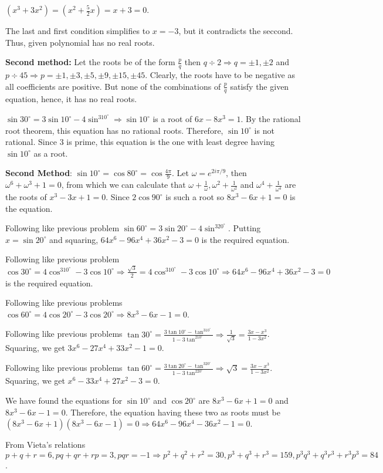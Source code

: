   $(x^3 + 3x^2) = \left(x^2 + \frac{5}{2}x\right) = x + 3 = 0$.

  The last and first condition simplifies to $x = -3$, but it contradicts the seccond. Thus, given
  polynomial has no real roots.

  {\bf Second method:} Let the roots be of the form $\frac{p}{q}$ then $q\div 2 \Rightarrow q = \pm 1, \pm
  2$ and $p\div 45 \Rightarrow p = \pm1, \pm3, \pm5, \pm9, \pm15, \pm45$. Clearly, the roots have to be
  negative as all coefficients are positive. But none of the combinations of $\frac{p}{q}$ satisfy the given
  equation, hence, it has no real roots.
\item $\sin30^\circ = 3\sin10^\circ - 4\sin^310^\circ \Rightarrow \sin10^\circ$ is a root of $6x - 8x^3 =
  1$. By the rational root theorem, this equation has no rational roots. Therefore, $\sin10^\circ$ is not
  rational. Since $3$ is prime, this equation is the one with least degree having $\sin10^\circ$ as a root.

  {\bf Second Method}: $\sin10^\circ = \cos80^\circ = \cos\frac{4\pi}{9}$. Let $\omega = e^{2i\pi/9}$, then
  $\omega^6 + \omega^3 + 1 = 0$, from which we can calculate that $\omega + \frac{1}{\omega}, \omega^2 +
  \frac{1}{\omega^2}$ and $\omega^4 + \frac{1}{\omega^4}$ are the roots of $x^3 - 3x + 1 = 0$. Since
  $2\cos90^\circ$ is such a root so $8x^3 - 6x + 1 = 0$ is the equation.
\item Following like previous problem $\sin60^\circ = 3\sin20^\circ - 4\sin^320^\circ$. Putting $x =
  \sin20^\circ$ and squaring, $64x^6 - 96x^4 + 36x^2 - 3 = 0$ is the required equation.
\item Following like previous problem $\cos30^\circ = 4\cos^310^\circ - 3\cos10^\circ \Rightarrow
  \frac{\sqrt{3}}{2} = 4\cos^310^\circ - 3\cos10^\circ \Rightarrow 64x^6 - 96x^4 + 36x^2 - 3 = 0$ is the
  required equation.
\item Following like previous problems $\cos60^\circ = 4\cos20^\circ - 3\cos20^\circ \Rightarrow 8x^3 - 6x -
  1 = 0$.
\item Following like previous problems $\tan30^\circ = \frac{3\tan10^\circ - \tan^310^\circ}{1 -
  3\tan^210^\circ} \Rightarrow \frac{1}{\sqrt{3}} = \frac{3x - x^3}{1 - 3x^2}$. Squaring, we get
  $3x^6 - 27x^4 + 33x^2 - 1 = 0$.
\item Following like previous problems $\tan60^\circ = \frac{3\tan20^\circ - \tan^320^\circ}{1 -
  3\tan^220^\circ} \Rightarrow \sqrt{3} = \frac{3x - x^3}{1 - 3x^2}$. Squaring, we get
  $x^6 - 33x^4 + 27x^2 - 3 = 0$.
\item We have found the equations for $\sin10^\circ$ and $\cos20^\circ$ are $8x^3 - 6x + 1 = 0$ and $8x^3 -
  6x - 1 = 0$. Therefore, the equation having these two as roots must be $(8x^3 - 6x + 1)(8x^3 - 6x - 1) = 0
  \Rightarrow 64x^6 - 96x^4 - 36x^2 - 1 = 0$.
\item From Vieta's relations $p + q + r = 6, pq + qr + rp = 3, pqr = -1\Rightarrow p^2 + q^2 + r^2 = 30, p^3
  + q^3 + r^3 = 159, p^3q^3 + q^3r^3 + r^3p^3 = 84$.

